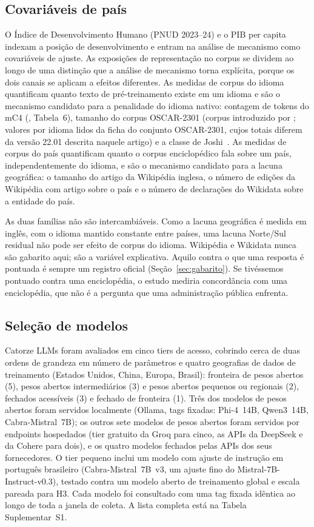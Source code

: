 \subsection{Covariáveis de país}
\label{sec:covariaveis}

O Índice de Desenvolvimento Humano (PNUD 2023--24) e o PIB per capita indexam
a posição de desenvolvimento e entram na análise de mecanismo como covariáveis
de ajuste. As exposições de representação no corpus se dividem ao longo de uma
distinção que a análise de mecanismo torna explícita, porque os dois canais se
aplicam a efeitos diferentes. As medidas de corpus do idioma quantificam quanto
texto de pré-treinamento existe em um idioma e são o mecanismo candidato para a
penalidade do idioma nativo: contagem de tokens do mC4 (\citealp{xue2021mt5},
Tabela~6), tamanho do corpus OSCAR-2301 (corpus introduzido por
\citealp{abadji2022oscar}; valores por idioma lidos da ficha do conjunto
OSCAR-2301, cujos totais diferem da versão 22.01 descrita naquele artigo) e a
classe de Joshi~\citep{joshi2020state}. As medidas de corpus do país
quantificam quanto o corpus enciclopédico fala sobre um país, independentemente
do idioma, e são o mecanismo candidato para a lacuna geográfica: o tamanho do
artigo da Wikipédia inglesa, o número de edições da Wikipédia com artigo sobre o
país e o número de declarações do Wikidata sobre a entidade do país.

As duas famílias não são intercambiáveis. Como a lacuna geográfica é medida em
inglês, com o idioma mantido constante entre países, uma lacuna Norte/Sul
residual não pode ser efeito de corpus do idioma. Wikipédia e Wikidata nunca são
gabarito aqui; são a variável explicativa. Aquilo contra o que uma resposta é
pontuada é sempre um registro oficial (Seção~\ref{sec:gabarito}). Se
tivéssemos pontuado contra uma enciclopédia, o estudo mediria concordância com
uma enciclopédia, que não é a pergunta que uma administração pública enfrenta.

\subsection{Seleção de modelos}

Catorze LLMs foram avaliados em cinco tiers de acesso, cobrindo cerca de duas
ordens de grandeza em número de parâmetros e quatro geografias de dados de
treinamento (Estados Unidos, China, Europa, Brasil): fronteira de pesos abertos
(5), pesos abertos intermediários (3) e pesos abertos pequenos ou regionais
(2), fechados acessíveis (3) e fechado de fronteira (1). Três dos modelos de
pesos abertos foram servidos localmente (Ollama, tags fixadas: Phi-4~14B,
Qwen3~14B, Cabra-Mistral~7B); os outros sete modelos de pesos abertos foram
servidos por endpoints hospedados (tier gratuito da Groq para cinco, as APIs
da DeepSeek e da Cohere para dois), e os quatro modelos fechados pelas APIs dos
seus fornecedores. O tier pequeno inclui um modelo com ajuste de instrução em
português brasileiro (Cabra-Mistral~7B~v3, um ajuste fino do
Mistral-7B-Instruct-v0.3), testado contra um modelo aberto de treinamento
global e escala pareada para H3. Cada modelo foi consultado com uma tag fixada
idêntica ao longo de toda a janela de coleta. A lista completa está na Tabela
Suplementar~S1.

